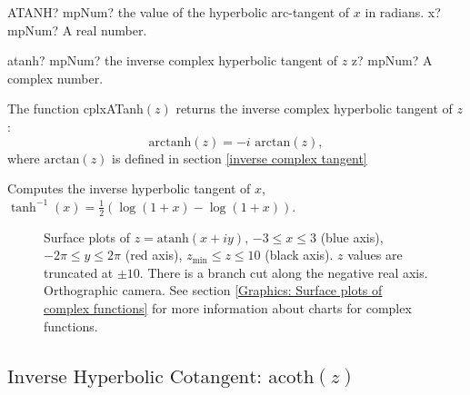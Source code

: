\begin{mpFunctionsExtract}
	\mpWorksheetFunctionOneNotImplemented
	{ATANH? mpNum? the value of the hyperbolic arc-tangent  of $x$ in radians.}
	{x? mpNum? A real number.}
\end{mpFunctionsExtract}


\vspace{0.6cm}


\begin{mpFunctionsExtract}
	\mpFunctionOne
	{atanh? mpNum? the inverse complex hyperbolic tangent of $z$}
	{z? mpNum? A complex number.}
\end{mpFunctionsExtract}

\vspace{0.3cm}
The function \textsf{cplxATanh$(z)$} returns the inverse complex hyperbolic tangent of $z$: 
\begin{equation}
	\text{arctanh}(z) = -i \text{ arctan}(z),
\end{equation}
where $\text{arctan}(z)$ is defined in section \ref{inverse complex tangent}

Computes the inverse hyperbolic tangent of $x$, $\tanh^{-1}(x)=\tfrac{1}{2} (\log(1+x) - \log(1+x))$.


\begin{figure}[ht]%
	\centering
	\qquad
	\caption[Complex Inverse Hyperbolic Tangent]{Surface plots of $z = \text{atanh}(x + iy)$, $-3 \leq x \leq 3$ (blue axis), $-2 \pi \leq y \leq 2\pi$ (red axis), $z_{\text{min}} \leq z \leq 10$ (black axis). $z$ values are truncated at $\pm 10$. There is a branch cut along the negative real axis. Orthographic camera. See section \ref{Graphics: Surface plots of complex functions} for more information about charts for complex functions.} 
	\label{fig:Complex Inverse Hyperbolic Tangent}%
\end{figure}



\newpage
\subsection{\texorpdfstring{$\text{Inverse Hyperbolic Cotangent: acoth}(z)$}{acoth}}
\label{inverse complex hyperbolic cotangent}

